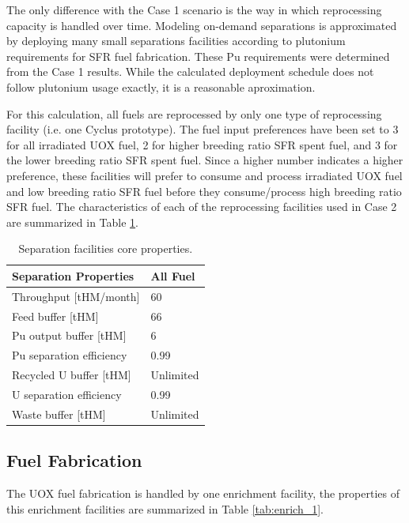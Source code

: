 \documentclass[12pt]{article}
\begin{document}
The only difference with the Case 1 scenario is the way in
which reprocessing capacity is handled over time.  Modeling on-demand
separations is approximated by deploying many small separations facilities according to plutonium
requirements for SFR fuel fabrication.  These Pu requirements were determined
from the Case 1 results. While the calculated deployment schedule does not
follow plutonium usage exactly, it is a reasonable aproximation. 

For this calculation, all fuels are reprocessed by only one type of
reprocessing facility (i.e. one Cyclus prototype). The fuel input preferences
have been set to 3 for all irradiated UOX fuel, 2 for higher breeding ratio
SFR spent fuel, and 3 for the lower breeding ratio SFR spent fuel.  Since a higher
number indicates a higher preference, these facilities will prefer to consume and process
irradiated UOX fuel and low breeding ratio SFR fuel before they consume/process 
high breeding ratio SFR fuel.  The characteristics of each of the
reprocessing facilities used in Case 2 are summarized in Table
\ref{tab:fuelfab_2}.

\begin{table}[h!]
    \centering
    \begin{tabular}{ll}
    \hline
    Separation Properties     &  All Fuel   \\
    \hline
    Throughput [tHM/month]    &  60         \\
    Feed buffer [tHM]         &  66         \\
    Pu output buffer  [tHM]   &  6          \\
    Pu separation efficiency  &  0.99       \\
    Recycled U buffer [tHM]   &  Unlimited  \\
    U separation efficiency   &  0.99       \\
    Waste buffer [tHM]        &  Unlimited  \\
    \hline
    \end{tabular}
    \caption{Separation facilities core properties.}
    \label{tab:fuelfab_2}
\end{table}

\subsection{Fuel Fabrication}

The UOX fuel fabrication is handled by one enrichment facility, the properties
of this enrichment facilities are summarized in Table \ref{tab:enrich_1}.
\end{document}
